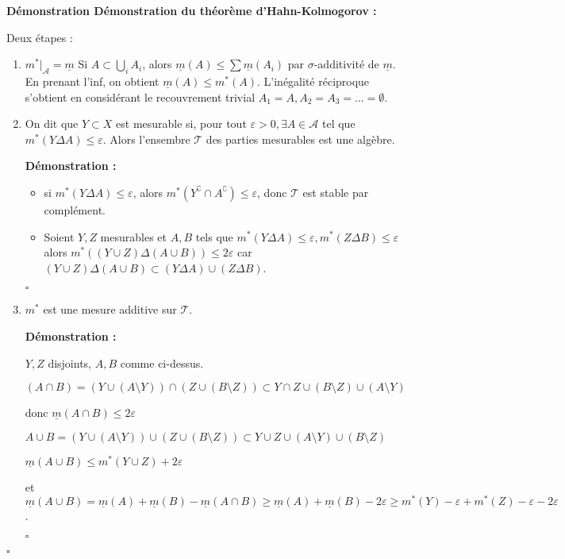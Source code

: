 \documentclass[10pt,a4paper,notitlepage ]{report}
\newcommand{\comp}[1]{#1^\complement}
\newcounter{th}
\newenvironment{demo}[1][]{

	\textbf{Démonstration #1 :}
}{\begin{flushright}
	$\square$
\end{flushright}
}
\begin{document}
\begin{demo}[Démonstration du théorème d'Hahn-Kolmogorov]
	Deux étapes : \begin{enumerate}
		\item $m^*|_{\mathcal A} = \underline m$
		Si $A \subset \underset i \bigcup A_i$, alors $\underline m (A) \le \sum \underline m (A_i)$ par $\sigma$-additivité de $\underline m$. En prenant l'inf, on obtient $\underline m(A) \le m^*(A)$. L'inégalité réciproque s'obtient en considérant le recouvrement trivial $A_1 = A, A_2=A_3 = \dots = \emptyset$.
		\item On dit que $Y \subset X$ est mesurable si, pour tout $\varepsilon > 0, \exists A \in \mathcal A$ tel que $m^*(Y \Delta A) \le \varepsilon$. Alors l'ensembre $\mathcal T$ des parties mesurables est une algèbre.
		\begin{demo}
			\begin{itemize}
				\item si $m^*(Y \Delta A) \le \varepsilon$, alors $m^*(\comp Y \cap \comp A) \le \varepsilon$, donc $\mathcal T$ est stable par complément.
				\item Soient $Y, Z$ mesurables et $A, B$ tels que $m^*(Y \Delta A) \le \varepsilon, m^*(Z \Delta B) \le \varepsilon$ alors $m^*((Y \cup Z) \Delta (A \cup B)) \le 2\varepsilon$ car $(Y \cup Z)  \Delta (A \cup B) \subset (Y \Delta A) \cup (Z \Delta B)$.
			\end{itemize}
		\end{demo}
		\item $m^*$ est une mesure additive sur $\mathcal T$.
		\begin{demo}
			$Y, Z$ disjoints, $A,B$ comme ci-dessus. 
			
			$(A\cap B) = (Y \cup (A \setminus Y)) \cap (Z \cup (B \setminus Z)) \subset Y \cap Z \cup (B \setminus Z) \cup (A \setminus Y)$ 
			
			donc $\underline m (A \cap B) \le 2\varepsilon$
			
			$A \cup B = (Y \cup (A \setminus Y)) \cup (Z \cup (B \setminus Z)) \subset Y \cup Z \cup (A \setminus Y) \cup (B \setminus Z)$
			
			$\underline m (A \cup B) \le m^*(Y \cup Z) +2\varepsilon$
			
			et $\underline m (A \cup B) = \underline m(A) + \underline m(B) - \underline m(A \cap B) \ge \underline m(A) + \underline m(B) -2\varepsilon \ge m^*(Y) - \varepsilon + m^*(Z) - \varepsilon - 2\varepsilon$.
			

\end{demo}
\end{enumerate}
\end{demo}
\end{document}

